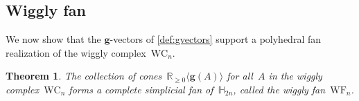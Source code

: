 \documentclass{amsart}
\newtheorem{theorem}{Theorem}%
\theoremstyle{definition}
\newcommand{\R}{\mathbb{R}} %
\newcommand{\HH}{\mathbb{H}} %
\renewcommand{\b}[1]{{\boldsymbol{#1}}} %
\newcommand{\darkblue}{\color{darkblue}} %
\newcommand{\defn}[1]{\textsl{\darkblue #1}} %
\newcommand{\wigglyComplex}{\mathrm{WC}} %
\newcommand{\wigglyFan}{\mathrm{WF}} %
\begin{document}


\subsection{Wiggly fan}
\label{subsec:wigglyFan}

We now show that the $\b{g}$-vectors of \cref{def:gvectors} support a polyhedral fan realization of the wiggly complex~$\wigglyComplex_n$.

\begin{theorem}
\label{thm:wigglyFan}
The collection of cones~$\R_{\ge 0} \langle \b{g}(A) \rangle$ for all~$A$ in the wiggly complex~$\wigglyComplex_n$ forms a complete simplicial fan of~$\HH_{2n}$, called the \defn{wiggly fan}~$\wigglyFan_n$.
\end{theorem}
\end{document}
